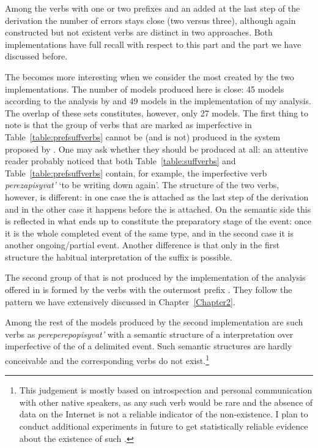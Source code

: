 Among the verbs with one or two prefixes and an  added at the last step of the derivation the number of errors stays close (two versus three), although again constructed but not existent verbs are distinct in two approaches. Both implementations have full recall with respect to this part and the part we have discussed before.

The  becomes more interesting when  we consider the most  created by the two implementations. The number of models produced here is close: 45 models according to the analysis by \citet{Tatevosov:09} and 49 models in the implementation of my analysis. The overlap of these sets constitutes, however, only 27 models. The first thing to note is that the group of verbs that are marked as imperfective in Table~\ref{table:prefsuffverbs} cannot be (and is not) produced in the system proposed by \citet{Tatevosov:09}. One may ask whether they should be produced at all: an attentive reader probably noticed that both Table~\ref{table:suffverbs} and Table~\ref{table:prefsuffverbs} contain, for example, the imperfective verb \textit{perezapisyvat'} `to be writing down again'. The structure of the two verbs, however, is different: in one case the  is attached as the last step of the derivation and in the other case it happens before the   is attached. On the semantic side this is reflected in what ends up to constitute the preparatory stage of the event: once it is the whole completed event of the same type, and in the second case it is another ongoing/partial event. Another difference is that only in the first structure the habitual interpretation of the suffix is possible. 

The second group of  that is not produced by the implementation of the analysis offered in \citealt{Tatevosov:09} is formed by the verbs with the outermost prefix . They follow the pattern we have extensively discussed in Chapter~\ref{Chapter2}.

Among the rest of the models produced by the second implementation are such verbs as \textit{pereperepopisyvat'} with a semantic structure of a  interpretation over imperfective of the  of a delimited event. Such semantic structures are hardly conceivable and the corresponding verbs do not exist.\footnote{This judgement is mostly based on introspection and personal communication with other native speakers, as any such verb would be rare and the absence of data on the Internet is not a reliable indicator of the non-existence. I plan to conduct additional experiments in future to get statistically reliable evidence about the existence of such .}

